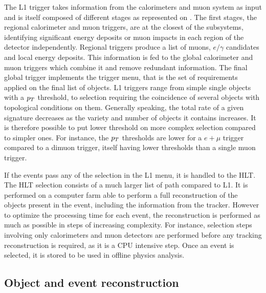         The L1 trigger takes information from the calorimeters and muon system as input
        and is itself composed of different stages as
        represented on . The first stages, the regional calorimeter
        and muon triggers, are at the closest of the subsystems, identifying significant
        energy deposits or muon impacts in each region of the detector independently.
        Regional triggers produce a list of muons, $e/\gamma$ candidates and local energy
        deposits. This information is fed to the global calorimeter and muon triggers which
        combine it and remove redundant information. The final global trigger implements
        the trigger menu, that is the set of requirements applied on the final list of
        objects. L1 triggers range from simple single objects with a $p_T$ threshold, to
        selection requiring the coincidence of several objects with topological conditions
        on them. Generally speaking, the total rate of a given signature decreases as the
        variety and number of objects it contains increases. It is therefore possible to
        put lower threshold on more complex selection compared to simpler ones. For instance,
        the $p_T$ thresholds are lower for a $e+\mu$ trigger compared to a dimuon trigger,
        itself having lower thresholds than a single muon trigger.

        If the events pass any of the selection in the L1 menu, it is handled to the HLT.
        The HLT selection consists of a much larger list of path compared to L1.
        It is performed on a computer farm able to perform a full reconstruction
        of the objects present in the event, including the information from the tracker.
        However to optimize the processing time for each event, the reconstruction is
        performed as much as possible in steps of increasing complexity. For instance,
        selection steps involving only calorimeters and muon detectors are performed before
        any tracking reconstruction is required, as it is a CPU intensive step. Once
        an event is selected, it is stored to be used in offline physics analysis.

        \subsection{Object and event reconstruction}

